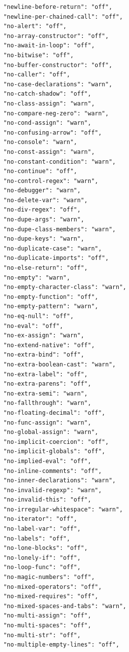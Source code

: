 \begin{small}
\begin{verbatim}
            "newline-before-return": "off",
            "newline-per-chained-call": "off",
            "no-alert": "off",
            "no-array-constructor": "off",
            "no-await-in-loop": "off",
            "no-bitwise": "off",
            "no-buffer-constructor": "off",
            "no-caller": "off",
            "no-case-declarations": "warn",
            "no-catch-shadow": "off",
            "no-class-assign": "warn",
            "no-compare-neg-zero": "warn",
            "no-cond-assign": "warn",
            "no-confusing-arrow": "off",
            "no-console": "warn",
            "no-const-assign": "warn",
            "no-constant-condition": "warn",
            "no-continue": "off",
            "no-control-regex": "warn",
            "no-debugger": "warn",
            "no-delete-var": "warn",
            "no-div-regex": "off",
            "no-dupe-args": "warn",
            "no-dupe-class-members": "warn",
            "no-dupe-keys": "warn",
            "no-duplicate-case": "warn",
            "no-duplicate-imports": "off",
            "no-else-return": "off",
            "no-empty": "warn",
            "no-empty-character-class": "warn",
            "no-empty-function": "off",
            "no-empty-pattern": "warn",
            "no-eq-null": "off",
            "no-eval": "off",
            "no-ex-assign": "warn",
            "no-extend-native": "off",
            "no-extra-bind": "off",
            "no-extra-boolean-cast": "warn",
            "no-extra-label": "off",
            "no-extra-parens": "off",
            "no-extra-semi": "warn",
            "no-fallthrough": "warn",
            "no-floating-decimal": "off",
            "no-func-assign": "warn",
            "no-global-assign": "warn",
            "no-implicit-coercion": "off",
            "no-implicit-globals": "off",
            "no-implied-eval": "off",
            "no-inline-comments": "off",
            "no-inner-declarations": "warn",
            "no-invalid-regexp": "warn",
            "no-invalid-this": "off",
            "no-irregular-whitespace": "warn",
            "no-iterator": "off",
            "no-label-var": "off",
            "no-labels": "off",
            "no-lone-blocks": "off",
            "no-lonely-if": "off",
            "no-loop-func": "off",
            "no-magic-numbers": "off",
            "no-mixed-operators": "off",
            "no-mixed-requires": "off",
            "no-mixed-spaces-and-tabs": "warn",
            "no-multi-assign": "off",
            "no-multi-spaces": "off",
            "no-multi-str": "off",
            "no-multiple-empty-lines": "off",

\end{verbatim}
\end{small}

